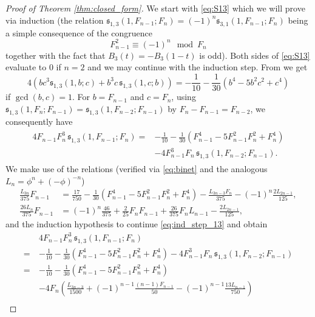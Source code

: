 \documentclass[]{interact}
\newcommand{\frs}{\mathfrak{s}}
\theoremstyle{definition}
\numberwithin{table}{section} %
\numberwithin{figure}{section}
\begin{document}
\begin{proof} [Proof of Theorem \ref{thm:closed_form}]
    We start with \eqref{eq:S13} which we will prove via induction (the relation $\frs^{}_{1, 3}(1, F_{n-1}; F_n) = (-1)^n \frs^{}_{3, 1}(1, F_{n-1}; F_n)$ being a simple consequence of the congruence
    $$
    F_{n-1}^2 \equiv (-1)^n \mod F_n
    $$
    together with the fact that $B_3(t) = -B_3(1-t)$ is odd). Both sides of \eqref{eq:S13} evaluate to $0$ if $n=2$ and we may continue with the induction step. From \cite{Apo52} we get
    $$
    4 \left( bc^3\frs^{}_{1, 3}(1, b; c) + b^3c \, \frs^{}_{1,3}(1,c;b) \right) = -\frac1{10}-\frac1{30}\left(b^4 -5b^2c^2+c^4\right)
    $$
    if $\gcd(b, c) = 1$. For $b = F_{n-1}$ and $c = F_n$, using $\frs^{}_{1, 3}(1, F_{n}; F_{n-1}) = \frs^{}_{1, 3}(1, F_{n-2}; F_{n-1})$ by $F_n-F_{n-1} = F_{n-2}$, we consequently have
    \begin{align} \label{eq:ind_step_13}
        \begin{split}
            4F_{n-1} F_n^3 \, \frs^{}_{1, 3}(1, F_{n-1}; F_n) = & -\frac1{10} - \frac1{30} \left(F_{n-1}^4 - 5 F_{n-1}^2 F_n^2 + F_n^4\right) \\
        & - 4F_{n-1}^3 F_n \, \frs^{}_{1, 3}(1, F_{n-2}; F_{n-1}).
        \end{split}
    \end{align}
    We make use of the relations (verified via \eqref{eq:binet} and the analogous $L_n = \phi^n + (-\phi)^{-n}$)
    \begin{align*}
        \frac{L_{3n}}{375} F_{n-1} & = \frac{17}{750} - \frac1{30} \left(F_{n-1}^4 - 5 F_{n-1}^2 F_n^2 + F_n^4\right) - \frac{L_{3n-3} F_n}{375} - (-1)^n \frac{2 L_{2n-1}}{125}, \\
        \frac{26L_n}{375}F_{n-1} & = (-1)^n \frac{46}{375} + \frac{2}{25} F_n F_{n-1} + \frac{26}{375} F_n L_{n-1} - \frac{2L_{2n-1}}{125},
    \end{align*}
    and the induction hypothesis to continue \eqref{eq:ind_step_13} and obtain
    \begin{align*}
        & 4F_{n-1} F_n^3 \, \frs^{}_{1, 3}(1, F_{n-1}; F_n)
        \\ =~& -\frac1{10} - \frac1{30} \left(F_{n-1}^4 - 5 F_{n-1}^2 F_n^2 + F_n^4\right) - 4F_{n-1}^3 F_n \, \frs^{}_{1, 3}(1, F_{n-2}; F_{n-1}) \\
        = ~& -\frac1{10} - \frac1{30} \left(F_{n-1}^4 - 5 F_{n-1}^2 F_n^2 + F_n^4\right) \\
        & - 4 F_n \left(\frac{L_{3n-3}}{1500} + (-1)^{n-1}\frac{(n-1)F_{n-1}}{50} - (-1)^{n-1} \frac{13L_{n-1}}{750}\right) \\

\end{align*}
\end{proof}
\end{document}
